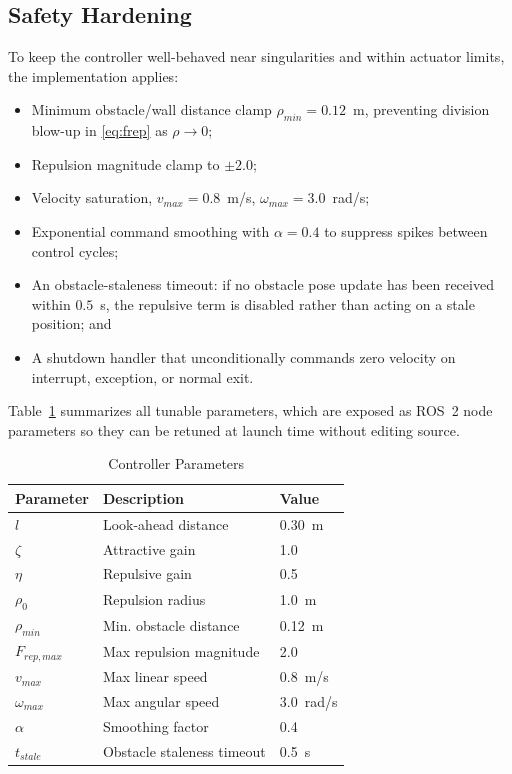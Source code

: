 \documentclass[conference]{IEEEtran}
\begin{document}
\subsection{Safety Hardening}
To keep the controller well-behaved near singularities and within actuator limits, the implementation applies:
\begin{itemize}
\item Minimum obstacle/wall distance clamp $\rho_{min}=0.12$~m, preventing division blow-up in \eqref{eq:frep} as $\rho\to0$;
\item Repulsion magnitude clamp to $\pm2.0$;
\item Velocity saturation, $v_{max}=0.8$~m/s, $\omega_{max}=3.0$~rad/s;
\item Exponential command smoothing with $\alpha=0.4$ to suppress spikes between control cycles;
\item An obstacle-staleness timeout: if no obstacle pose update has been received within $0.5$~s, the repulsive term is disabled rather than acting on a stale position; and
\item A shutdown handler that unconditionally commands zero velocity on interrupt, exception, or normal exit.
\end{itemize}
Table~\ref{tab:params} summarizes all tunable parameters, which are exposed as ROS~2 node parameters so they can be retuned at launch time without editing source.

\begin{table}[h]
\centering
\caption{Controller Parameters}
\label{tab:params}
\begin{tabular}{lll}
\toprule
Parameter & Description & Value \\
\midrule
$l$ & Look-ahead distance & 0.30~m \\
$\zeta$ & Attractive gain & 1.0 \\
$\eta$ & Repulsive gain & 0.5 \\
$\rho_0$ & Repulsion radius & 1.0~m \\
$\rho_{min}$ & Min. obstacle distance & 0.12~m \\
$F_{rep,max}$ & Max repulsion magnitude & 2.0 \\
$v_{max}$ & Max linear speed & 0.8~m/s \\
$\omega_{max}$ & Max angular speed & 3.0~rad/s \\
$\alpha$ & Smoothing factor & 0.4 \\
$t_{stale}$ & Obstacle staleness timeout & 0.5~s \\
\bottomrule
\end{tabular}
\end{table}
\end{document}
